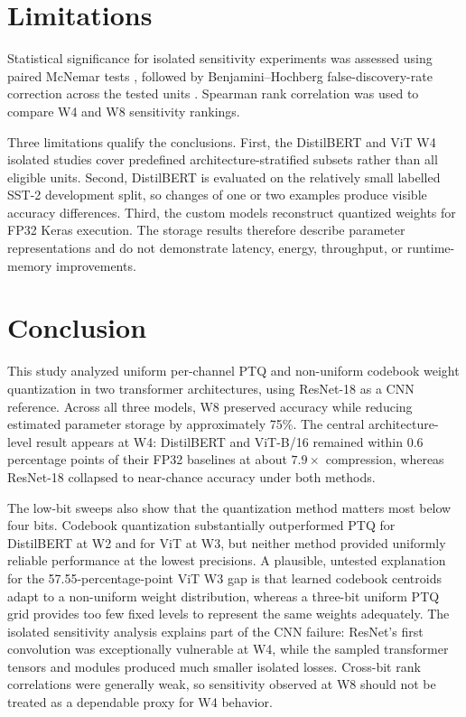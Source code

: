 \documentclass[conference]{IEEEtran}
\begin{document}
\FloatBarrier

\section{Limitations}

Statistical significance for isolated sensitivity experiments was assessed using paired McNemar tests \cite{dietterich1998}, followed by Benjamini--Hochberg false-discovery-rate correction across the tested units \cite{benjamini1995}. Spearman rank correlation was used to compare W4 and W8 sensitivity rankings.

Three limitations qualify the conclusions. First, the DistilBERT and ViT W4 isolated studies cover predefined architecture-stratified subsets rather than all eligible units. Second, DistilBERT is evaluated on the relatively small labelled SST-2 development split, so changes of one or two examples produce visible accuracy differences. Third, the custom models reconstruct quantized weights for FP32 Keras execution. The storage results therefore describe parameter representations and do not demonstrate latency, energy, throughput, or runtime-memory improvements.

\section{Conclusion}

This study analyzed uniform per-channel PTQ and non-uniform codebook weight quantization in two transformer architectures, using ResNet-18 as a CNN reference. Across all three models, W8 preserved accuracy while reducing estimated parameter storage by approximately 75\%. The central architecture-level result appears at W4: DistilBERT and ViT-B/16 remained within 0.6 percentage points of their FP32 baselines at about $7.9\times$ compression, whereas ResNet-18 collapsed to near-chance accuracy under both methods.

The low-bit sweeps also show that the quantization method matters most below four bits. Codebook quantization substantially outperformed PTQ for DistilBERT at W2 and for ViT at W3, but neither method provided uniformly reliable performance at the lowest precisions. A plausible, untested explanation for the 57.55-percentage-point ViT W3 gap is that learned codebook centroids adapt to a non-uniform weight distribution, whereas a three-bit uniform PTQ grid provides too few fixed levels to represent the same weights adequately. The isolated sensitivity analysis explains part of the CNN failure: ResNet's first convolution was exceptionally vulnerable at W4, while the sampled transformer tensors and modules produced much smaller isolated losses. Cross-bit rank correlations were generally weak, so sensitivity observed at W8 should not be treated as a dependable proxy for W4 behavior.
\end{document}
